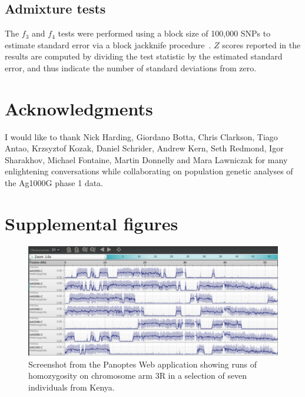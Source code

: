\documentclass[a4paper,11pt,abstracton,hidelinks]{scrartcl}
\begin{document}
\subsection{Admixture tests}\label{subsec:methods-admixture}


The $f_3$ and $f_4$ tests were performed using a block size of 100,000 SNPs to estimate standard error via a block jackknife procedure~\parencite{Patterson2012}.
%
$Z$ scores reported in the results are computed by dividing the test statistic by the estimated standard error, and thus indicate the number of standard deviations from zero.


\section{Acknowledgments}\label{sec:acknowledgments}


I would like to thank Nick Harding, Giordano Botta, Chris Clarkson, Tiago Antao, Krzsyztof Kozak, Daniel Schrider, Andrew Kern, Seth Redmond, Igor Sharakhov, Michael Fontaine, Martin Donnelly and Mara Lawniczak for many enlightening conversations while collaborating on population genetic analyses of the Ag1000G phase 1 data.


\printbibliography


\clearpage
\beginsupplement
\section{Supplemental figures}\label{sec:supplemental-figures}


\begin{figure}[h!]
\centering
\includegraphics[width=1.1\textwidth,center]{artwork/chapter4/keroh.pdf}
\caption{Screenshot from the Panoptes Web application showing runs of homozygosity on chromosome arm 3R in a selection of seven individuals from Kenya.
%
}
\label{fig:keroh}
\end{figure}
\end{document}
